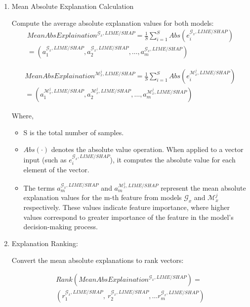 \documentclass{article}
\begin{document}
\begin{enumerate}
    \item Mean Absolute Explanation Calculation
    
    Compute the average absolute explanation values for both models:
\begin{align}
    {MeanAbsExplaination}^{\mathcal{G}_{x},LIME/SHAP} = \frac{1}{S}\sum_{i = 1}^{S}{Abs(e_{i}^{\mathcal{G}_{x},LIME/SHAP})} \nonumber\\
    =(a_{1}^{\mathcal{G}_{x},LIME/SHAP},a_{2}^{\mathcal{G}_{x},LIME/SHAP},\ldots,a_{m}^{\mathcal{G}_{x},LIME/SHAP})\nonumber
\end{align}
    
\begin{align}{MeanAbsExplaination}^{\mathcal{M}_{x}^{j},LIME/SHAP} = \frac{1}{S}\sum_{i = 1}^{S}{Abs(e_{i}^{\mathcal{M}_{x}^{j},LIME/SHAP})} \nonumber\\= (a_{1}^{\mathcal{M}_{x}^{j},LIME/SHAP},a_{2}^{\mathcal{M}_{x}^{j},LIME/SHAP},\ldots,a_{m}^{\mathcal{M}_{x}^{j},LIME/SHAP}) \nonumber
\end{align}
    
    Where,
    
    \begin{itemize}
        \item S is the total number of samples.
        \item $Abs( \cdot )$ denotes the absolute value operation. When applied to a vector input (such as $e_{i}^{\mathcal{G}_{x},LIME/SHAP}$), it computes the absolute value for each element of the vector.
        \item The terms $a_{m}^{\mathcal{G}_{x},LIME/SHAP}$ and $a_{m}^{\mathcal{M}_{x}^{j},LIME/SHAP}$ represent the mean absolute explanation values for the m-th feature from models $\mathcal{G}_{x}$ and $\mathcal{M}_{x}^{j}$ respectively. These values indicate feature importance, where higher values correspond to greater importance of the feature in the model's decision-making process.
    \end{itemize}
    
    \item Explanation Ranking:
    
    Convert the mean absolute explanations to rank vectors:

\begin{align}
    Rank\left( {MeanAbsExplaination}^{\mathcal{G}_{x},LIME/SHAP} \right) = \nonumber\\(r_{1}^{\mathcal{G}_{x},LIME/SHAP},\ r_{2}^{\mathcal{G}_{x},LIME/SHAP},\ldots r_{m}^{\mathcal{G}_{x},LIME/SHAP})\nonumber
\end{align}
    

\end{enumerate}
\end{document}
